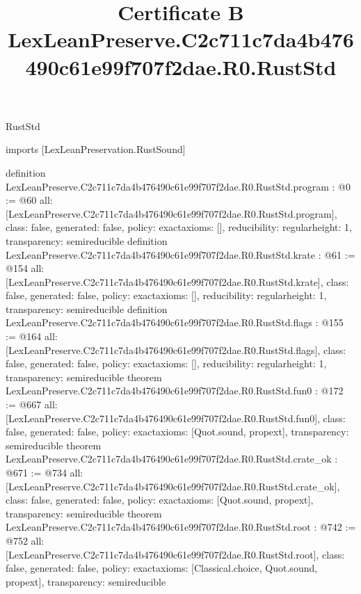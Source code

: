 \begin{lexlean}{RustStd}
\title{Certificate B LexLeanPreserve.C2c711c7da4b476490c61e99f707f2dae.R0.RustStd}
\begin{coremodule}
imports [LexLeanPreservation.RustSound]

definition LexLeanPreserve.C2c711c7da4b476490c61e99f707f2dae.R0.RustStd.program : @0 := @60 {
  all: [LexLeanPreserve.C2c711c7da4b476490c61e99f707f2dae.R0.RustStd.program],
  class: false,
  generated: false,
  policy: exact{axioms: []},
  reducibility: regular{height: 1},
  transparency: semireducible
}
definition LexLeanPreserve.C2c711c7da4b476490c61e99f707f2dae.R0.RustStd.krate : @61 := @154 {
  all: [LexLeanPreserve.C2c711c7da4b476490c61e99f707f2dae.R0.RustStd.krate],
  class: false,
  generated: false,
  policy: exact{axioms: []},
  reducibility: regular{height: 1},
  transparency: semireducible
}
definition LexLeanPreserve.C2c711c7da4b476490c61e99f707f2dae.R0.RustStd.flags : @155 := @164 {
  all: [LexLeanPreserve.C2c711c7da4b476490c61e99f707f2dae.R0.RustStd.flags],
  class: false,
  generated: false,
  policy: exact{axioms: []},
  reducibility: regular{height: 1},
  transparency: semireducible
}
theorem LexLeanPreserve.C2c711c7da4b476490c61e99f707f2dae.R0.RustStd.fun0 : @172 := @667 {
  all: [LexLeanPreserve.C2c711c7da4b476490c61e99f707f2dae.R0.RustStd.fun0],
  class: false,
  generated: false,
  policy: exact{axioms: [Quot.sound, propext]},
  transparency: semireducible
}
theorem LexLeanPreserve.C2c711c7da4b476490c61e99f707f2dae.R0.RustStd.crate_ok : @671 := @734 {
  all: [LexLeanPreserve.C2c711c7da4b476490c61e99f707f2dae.R0.RustStd.crate_ok],
  class: false,
  generated: false,
  policy: exact{axioms: [Quot.sound, propext]},
  transparency: semireducible
}
theorem LexLeanPreserve.C2c711c7da4b476490c61e99f707f2dae.R0.RustStd.root : @742 := @752 {
  all: [LexLeanPreserve.C2c711c7da4b476490c61e99f707f2dae.R0.RustStd.root],
  class: false,
  generated: false,
  policy: exact{axioms: [Classical.choice, Quot.sound, propext]},
  transparency: semireducible
}


\end{coremodule}
\end{lexlean}
